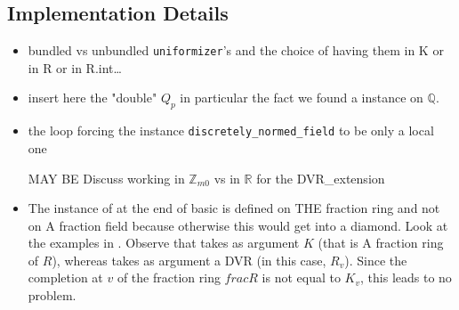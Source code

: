 \documentclass[sigplan,10pt,anonymous,review]{acmart}\settopmatter{printfolios=true,printccs=false,printacmref=false}
\newcommand{\mi}[1]{{\color{purple} #1}}
\newcommand*{\ZZ}{\mathbb{Z}}
\newcommand*{\RR}{\mathbb{R}}
\newcommand*{\QQ}{\mathbb{Q}}
\begin{document}
\subsection{Implementation Details}
\begin{itemize}
	\item bundled vs unbundled \texttt{uniformizer}'s and the choice of having them in K or in R or in R.int\dots
	\item insert here the "double" $Q_p$ in particular the fact we found a  instance on $\QQ$.
	\item the loop forcing the instance \texttt{discretely\_normed\_field} to be only a local one
	\item [MAY BE] Discuss working in $\ZZ_{m0}$ vs in $\RR$ for the DVR\_extension
	\item The instance of  at the end of basic is defined on THE fraction ring and not on A fraction field because otherwise this would get into a diamond. Look at the examples in . Observe that  takes as argument $K$ (that is A fraction ring of $R$), whereas  takes as argument a DVR (in this case, $R_v$). Since the completion at $v$ of the fraction ring $frac R$ is not equal to $K_v$, this leads to no problem.
\end{itemize}

\begin{acks}
\mi{}
\end{acks}





\end{document}
